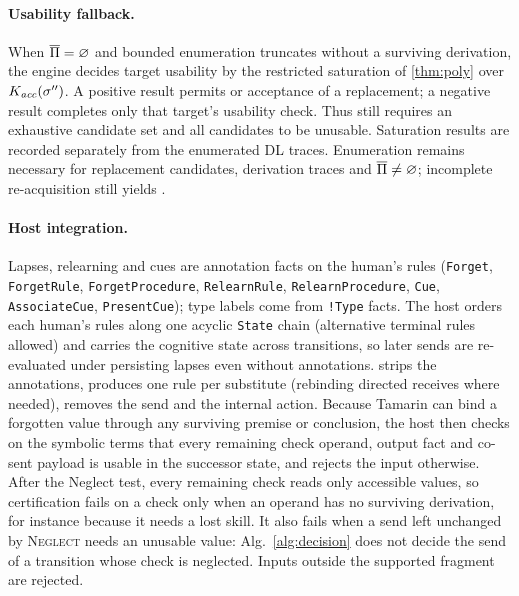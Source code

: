 \paragraph{Usability fallback.}
When $\overline{\Pi}=\varnothing$ and bounded enumeration truncates without a surviving derivation, the engine decides target usability by the restricted saturation of \cref{thm:poly} over $K_{\mathit{acc}}(\sigma'')$. A positive result permits \preserve{} or acceptance of a replacement; a negative result completes only that target's usability check. Thus \skipm{} still requires an exhaustive candidate set and all candidates to be unusable. Saturation results are recorded separately from the enumerated DL traces. Enumeration remains necessary for replacement candidates, derivation traces and $\overline{\Pi}\neq\varnothing$; incomplete re-acquisition still yields \unknowncov{}.

\paragraph{Host integration.} Lapses, relearning and cues are annotation facts on the human's rules (\texttt{Forget}, \texttt{ForgetRule}, \texttt{ForgetProcedure}, \texttt{RelearnRule}, \texttt{RelearnProcedure}, \texttt{Cue}, \texttt{AssociateCue}, \texttt{PresentCue}); type labels come from \texttt{!Type} facts. The host orders each human's rules along one acyclic \texttt{State} chain (alternative terminal rules allowed) and carries the cognitive state across transitions, so later sends are re-evaluated under persisting lapses even without annotations. \preserve{} strips the annotations, \replace{} produces one rule per substitute (rebinding directed receives where needed), \skipm{} removes the send and \neglect{} the internal action. Because Tamarin can bind a forgotten value through any surviving premise or conclusion, the host then checks on the symbolic terms that every remaining check operand, output fact and co-sent payload is usable in the successor state, and rejects the input otherwise. After the Neglect test, every remaining check reads only accessible values, so certification fails on a check only when an operand has no surviving derivation, for instance because it needs a lost skill. It also fails when a send left unchanged by \textsc{Neglect} needs an unusable value: Alg.~\ref{alg:decision} does not decide the send of a transition whose check is neglected. Inputs outside the supported fragment are rejected.